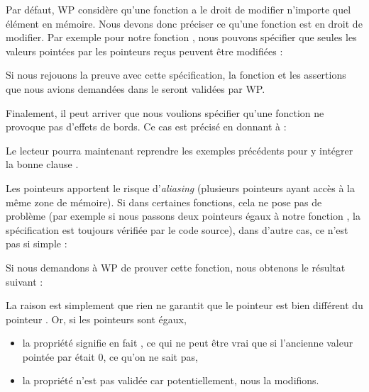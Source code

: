 Par défaut, WP considère qu'une fonction a le droit de modifier n'importe quel
élément en mémoire. Nous devons donc préciser ce qu'une fonction est en droit
de modifier. Par exemple pour notre fonction , nous pouvons
spécifier que seules les valeurs pointées par les pointeurs reçus peuvent être
modifiées :






Si nous rejouons la preuve avec cette spécification, la fonction et les
assertions que nous avions demandées dans le  seront validées par WP.



Finalement, il peut arriver que nous voulions spécifier qu'une fonction ne
provoque pas d'effets de bords. Ce cas est précisé en donnant 
à  :






Le lecteur pourra maintenant reprendre les exemples précédents pour y intégrer
la bonne clause .





Les pointeurs apportent le risque d'\textit{aliasing} (plusieurs pointeurs ayant accès à
la même zone de mémoire). Si dans certaines fonctions, cela ne pose pas de
problème (par exemple si nous passons deux pointeurs égaux
à notre fonction , la spécification est toujours vérifiée par le
code source), dans d'autre cas, ce n'est pas si simple :






Si nous demandons à WP de prouver cette fonction, nous obtenons le
résultat suivant :





La raison est simplement que rien ne garantit que le pointeur  est bien
différent du pointeur . Or, si les pointeurs sont égaux,



\begin{itemize}
\item la propriété  signifie en fait
, ce qui ne peut être vrai que si l'ancienne valeur
pointée par  était 0, ce qu'on ne sait pas,
\item la propriété  n'est pas validée car potentiellement,
nous la modifions.
\end{itemize}


